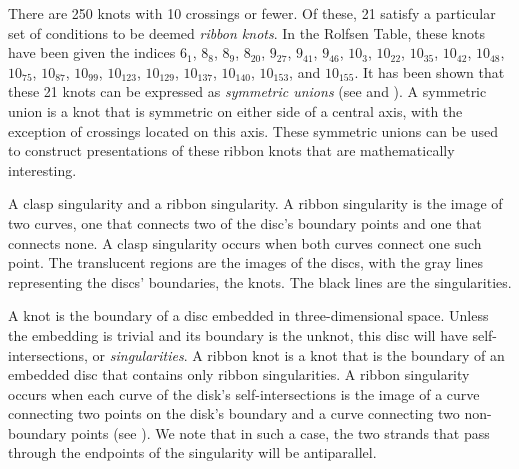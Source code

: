 \begin{paper}

There are 250 knots with 10 crossings or fewer.
Of these, 21 satisfy a particular set of conditions to be deemed \textit{ribbon
knots}.
In the Rolfsen Table, these knots have been given the indices $6_1$, $8_8$,
$8_9$, $8_{20}$, $9_{27}$, $9_{41}$, $9_{46}$, $10_3$, $10_{22}$, $10_{35}$,
$10_{42}$, $10_{48}$, $10_{75}$, $10_{87}$, $10_{99}$, $10_{123}$, $10_{129}$,
$10_{137}$, $10_{140}$, $10_{153}$, and $10_{155}$.
It has been shown that these 21 knots can be expressed as \textit{symmetric
unions} (see \cite{many} and \cite{one}).
A symmetric union is a knot that is symmetric on either side of a central axis,
with the exception of crossings located on this axis.
These symmetric unions can be used to construct presentations of these ribbon
knots that are mathematically interesting.

{A clasp singularity and a ribbon singularity.
A ribbon singularity is the image of two curves, one that connects two of the
disc's boundary points and one that connects none.
A clasp singularity occurs when both curves connect one such point.
The translucent regions are the images of the discs, with the gray lines
representing the discs' boundaries, the knots.
The black lines are the singularities.}

A knot is the boundary of a disc embedded in three-dimensional space.
Unless the embedding is trivial and its boundary is the unknot, this disc will
have self-intersections, or \textit{singularities}.
A ribbon knot is a knot that is the boundary of an embedded disc that contains
only ribbon singularities.
A ribbon singularity occurs when each curve of the disk's self-intersections is
the image of a curve connecting two points on the disk's boundary and a curve
connecting two non-boundary points (see \figSingularities).
We note that in such a case, the two strands that pass through the endpoints of
the singularity will be antiparallel.



\end{paper}

